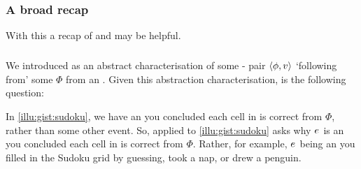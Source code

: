 \subsubsection{A broad recap}


\begin{note}
  With this a recap of \qWhy{} and \qHow{} may be helpful.
\end{note}


\subparagraph*{\qWhy{}}


\begin{note}
  We introduced \ros{} as an abstract characterisation of some - pair \(\langle\phi, v\rangle\) `following from' some \pool{} \(\Phi\) from an \agpe{}.
  Given this abstraction characterisation, \qWhy{} is the following question:

\end{note}


\begin{note}
  In \autoref{illu:gist:sudoku}, we have an  you concluded each cell in \sudokuPuzL{} is correct from \(\Phi\), rather than some other event.
  So, \qWhy{} applied to \autoref{illu:gist:sudoku} asks why \(e\sb{}\) is an  you concluded each cell in \sudokuPuzL{} is correct from \(\Phi\).
  Rather, for example, \(e\sb{}\) being an  you filled in the Sudoku grid by guessing, took a nap, or drew a penguin.
\end{note}


